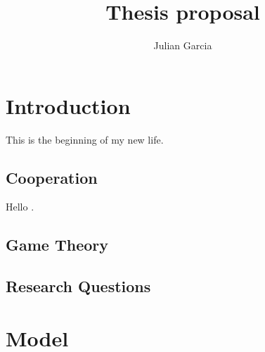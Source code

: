 \documentclass[11pt]{report}
\title{Thesis proposal}
\author{Julian Garcia}
\begin{document}
\maketitle

\chapter{Introduction}

This is the beginning of my new life.

\section{Cooperation}

Hello \cite{garcia:JTB:2012}.

\section{Game Theory}

\section{Research Questions}

\chapter{Model}



\end{document}
